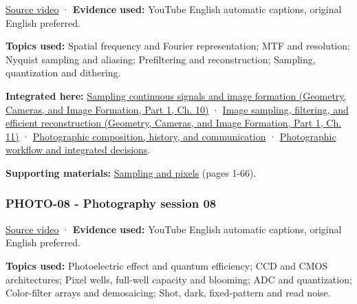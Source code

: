\hypertarget{04-visual-computing-ii-ch036-photo-07---photography-session-07}{}

\href{https://www.youtube.com/watch?v=02tgqvQzp0Y}{Source video} · \textbf{Evidence used:} YouTube English automatic captions, original English preferred.

\textbf{Topics used:} Spatial frequency and Fourier representation; MTF and resolution; Nyquist sampling and aliasing; Prefiltering and reconstruction; Sampling, quantization and dithering.

\textbf{Integrated here:} \href{../03-Geometry-Cameras-and-Image-Formation-P01/main.pdf\#nameddest=03-visual-computing-i-ch003-sampling-continuous-signals-and-image-formation}{Sampling continuous signals and image formation (Geometry, Cameras, and Image Formation, Part 1, Ch. 10)} · \href{../03-Geometry-Cameras-and-Image-Formation-P01/main.pdf\#nameddest=03-visual-computing-i-ch004-image-sampling-filtering-and-efficient-reconstruction}{Image sampling, filtering, and efficient reconstruction (Geometry, Cameras, and Image Formation, Part 1, Ch. 11)} · \hyperref[04-visual-computing-ii-ch034-photographic-composition-history-and-communication]{Photographic composition, history, and communication} · \hyperref[04-visual-computing-ii-ch034-photographic-workflow-and-integrated-decisions]{Photographic workflow and integrated decisions}.

\textbf{Supporting materials:} \href{https://drive.google.com/open?id=0B6w2XfPHEcZYc1lhZjNHU1NNVDQ}{Sampling and pixels} (pages 1-66).

\subsubsection{PHOTO-08 - Photography session 08}\label{04-visual-computing-ii-ch036-photo-08---photography-session-08}

\hypertarget{04-visual-computing-ii-ch036-photo-08---photography-session-08}{}

\href{https://www.youtube.com/watch?v=VSdUlxgpKn4}{Source video} · \textbf{Evidence used:} YouTube English automatic captions, original English preferred.

\textbf{Topics used:} Photoelectric effect and quantum efficiency; CCD and CMOS architectures; Pixel wells, full-well capacity and blooming; ADC and quantization; Color-filter arrays and demosaicing; Shot, dark, fixed-pattern and read noise.

